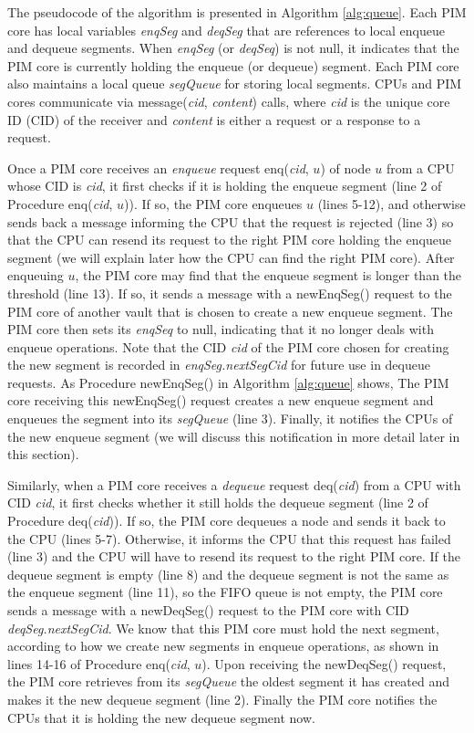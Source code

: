 The pseudocode of the algorithm is presented in Algorithm \ref{alg:queue}. 
Each PIM core has local variables \textit{enqSeg} and \textit{deqSeg} that are references to 
local enqueue and dequeue segments.
When \textit{enqSeg} (or \textit{deqSeq}) is not null, it indicates that the PIM core is currently 
holding the enqueue (or dequeue) segment.
Each PIM core also maintains a local queue \textit{segQueue} for storing local segments.
CPUs and PIM cores communicate via message(\textit{cid}, \textit{content}) calls, 
where \textit{cid} is the unique core ID (CID) 
of the receiver and \textit{content} is either a request or a response to a request.

Once a PIM core receives an \emph{enqueue} request enq(\textit{cid}, $u$) of node $u$ from a CPU whose CID is \textit{cid},
it first checks if it is holding the enqueue segment (line 2 of Procedure enq(\textit{cid}, $u$)).
If so, the PIM core enqueues $u$ (lines 5-12), and otherwise sends back a message
informing the CPU that the request is rejected (line 3) so that
the CPU can resend its request to the right PIM core holding the enqueue segment
(we will explain later how the CPU can find the right PIM core).
After enqueuing $u$, the PIM core may find that the enqueue segment is longer than the threshold (line 13).
If so, it sends a message with a newEnqSeg() request to the PIM core of another vault that is chosen 
to create a new enqueue segment.
The PIM core then sets its \textit{enqSeq} to null, indicating that it no longer deals with enqueue operations.
Note that the CID \textit{cid} of the PIM core chosen for creating the new segment is recorded in 
\textit{enqSeg.nextSegCid} for future use in dequeue requests.
As Procedure newEnqSeg() in Algorithm \ref{alg:queue} shows,
The PIM core receiving this newEnqSeg() request creates a new enqueue segment and 
enqueues the segment into its \textit{segQueue} (line 3).
Finally, it notifies the CPUs of the new enqueue segment 
(we will discuss this notification in more detail later in this section).

Similarly, when a PIM core receives a \emph{dequeue} request deq(\textit{cid}) from a CPU with CID \textit{cid},
it first checks whether it still holds the dequeue segment (line 2 of Procedure deq(\textit{cid})).
If so, the PIM core dequeues a node and sends it back to the CPU (lines 5-7).
Otherwise, it informs the CPU that this request has failed (line 3) and
the CPU will have to resend its request to the right PIM core.
If the dequeue segment is empty (line 8) and the dequeue segment is not the same as 
the enqueue segment (line 11), so the FIFO queue is not empty, 
the PIM core sends a message with a newDeqSeg() request 
to the PIM core with CID \textit{deqSeg.nextSegCid}. 
We know that this PIM core must hold the next segment, 
according to how we create new segments in enqueue operations, 
as shown in lines 14-16 of Procedure enq(\textit{cid}, $u$). 
Upon receiving the newDeqSeg() request, 
the PIM core retrieves from its \textit{segQueue} the oldest segment it has created and 
makes it the new dequeue segment (line 2). 
Finally the PIM core notifies the CPUs that it is holding the new dequeue segment now.

